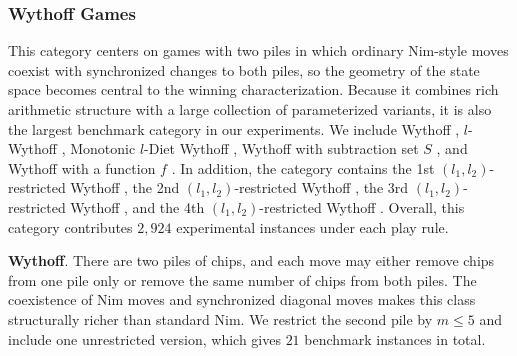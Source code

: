 \documentclass[review]{elsarticle}
\newcommand{\set}[1]{\{ #1 \}}
\newcommand{\tuple}[1]{\langle {#1} \rangle}
\newcommand{\true}{\top}
\newcommand{\statevar}{\mathcal{X}}
\newcommand{\act}{\mathcal{A}}
\newcommand{\constraint}{\mathcal{C}}
\newcommand{\estate}{\mathcal{E}}
\newcommand{\pre}{\mathtt{pre}}
\newcommand{\eff}{\mathtt{eff}}
\begin{document}
{\color{red}\subsubsection{Wythoff Games}}
{\color{red}This category centers on games with two piles in which ordinary Nim-style moves coexist with synchronized changes to both piles, so the geometry of the state space becomes central to the winning characterization.}
{\color{red}Because it combines rich arithmetic structure with a large collection of parameterized variants, it is also the largest benchmark category in our experiments.}
{\color{red}We include Wythoff \cite{Wyt1907}, $l$-Wythoff \cite{Fra1982}, Monotonic $l$-Diet Wythoff \cite{AhnCCEFGGKMPS2017}, Wythoff with subtraction set $S$ \cite{DucFGN2009}, and Wythoff with a function $f$ \cite{LiuZ2015}.}
{\color{red}In addition, the category contains the 1st $(l_1,l_2)$-restricted Wythoff \cite{FraH2014}, the 2nd $(l_1,l_2)$-restricted Wythoff \cite{Gur2012}, the 3rd $(l_1,l_2)$-restricted Wythoff \cite{LiuL2014}, and the 4th $(l_1,l_2)$-restricted Wythoff \cite{EriS2009}.}
{\color{red}Overall, this category contributes $2,924$ experimental instances under each play rule.}

{\color{red}\textbf{Wythoff}. There are two piles of chips, and each move may either remove chips from one pile only or remove the same number of chips from both piles.}
{\color{red}The coexistence of Nim moves and synchronized diagonal moves makes this class structurally richer than standard Nim.}
{\color{red}We restrict the second pile by $m \le 5$ and include one unrestricted version, which gives $21$ benchmark instances in total.}
\end{document}
